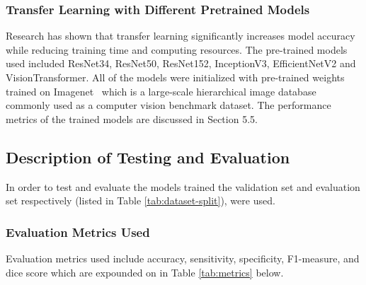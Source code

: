 \documentclass[12pt, a4paper]{article}
\begin{document}
\subsubsection{Transfer Learning with Different Pretrained Models}
Research has shown that transfer learning significantly increases model accuracy while reducing training time and computing resources. The pre-trained models used included ResNet34, ResNet50, ResNet152, InceptionV3, EfficientNetV2 and VisionTransformer. All of the models were initialized with  pre-trained weights trained on Imagenet~\citep{deng2009imagenet} which is a large-scale hierarchical image database commonly used as a computer vision benchmark dataset. The performance metrics of the trained models are discussed in Section 5.5.
\subsection{Description of Testing and Evaluation}
In order to test and evaluate the models trained the validation set and evaluation set respectively (listed in Table \ref{tab:dataset-split}), were used.
\subsubsection{Evaluation Metrics Used}
Evaluation metrics used include accuracy, sensitivity, specificity, F1-measure, and dice score which are expounded on in Table \ref{tab:metrics} below.
\end{document}
